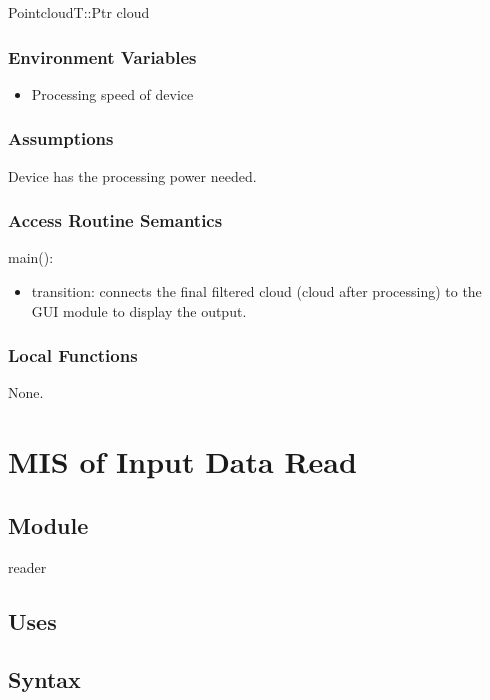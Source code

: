 \documentclass[12pt, titlepage]{article}
\begin{document}
PointcloudT::Ptr cloud 

\subsubsection{Environment Variables}

\begin{itemize}
\item Processing speed of device
\end{itemize}

\subsubsection{Assumptions}

Device has the processing power needed.

\subsubsection{Access Routine Semantics}

\noindent main():
\begin{itemize}
\item transition: connects the final filtered cloud (cloud after processing) to the GUI module to display the output.
\end{itemize}


\subsubsection{Local Functions}

None.

\newpage

\section{MIS of Input Data Read} \label{ModuleIDR} 

\subsection{Module}
reader
\subsection{Uses}

\subsection{Syntax}
\end{document}
